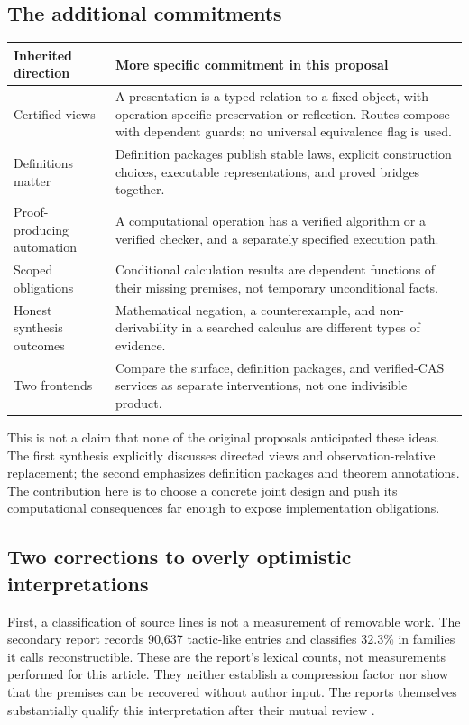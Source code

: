 \documentclass[11pt,letterpaper]{article}
\numberwithin{equation}{section}
\begin{document}
\subsection{The additional commitments}

\begin{tabularx}{\textwidth}{@{}P{.27\textwidth}Y@{}}
\toprule
Inherited direction & More specific commitment in this proposal\\
\midrule
Certified views & A presentation is a typed relation to a fixed object, with
operation-specific preservation or reflection. Routes compose with dependent
guards; no universal equivalence flag is used.\\
Definitions matter & Definition packages publish stable laws, explicit
construction choices, executable representations, and proved bridges together.\\
Proof-producing automation & A computational operation has a verified algorithm
or a verified checker, and a separately specified execution path.\\
Scoped obligations & Conditional calculation results are dependent functions
of their missing premises, not temporary unconditional facts.\\
Honest synthesis outcomes & Mathematical negation, a counterexample, and
non-derivability in a searched calculus are different types of evidence.\\
Two frontends & Compare the surface, definition packages, and verified-CAS
services as separate interventions, not one indivisible product.\\
\bottomrule
\end{tabularx}


This is not a claim that none of the original proposals anticipated these ideas.
The first synthesis explicitly discusses directed views and observation-relative
replacement; the second emphasizes definition packages and theorem annotations.
The contribution here is to choose a concrete joint design and push its
computational consequences far enough to expose implementation obligations.

\subsection{Two corrections to overly optimistic interpretations}
First, a classification of source lines is not a measurement of removable work.
The secondary report records 90,637 tactic-like entries and classifies 32.3\% in
families it calls reconstructible. These are the report's lexical counts, not
measurements performed for this article. They neither establish a compression
factor nor show that the premises can be recovered without author input. The
reports themselves substantially qualify this interpretation after their mutual
review \cite{synthesis,blueprints}.
\end{document}
